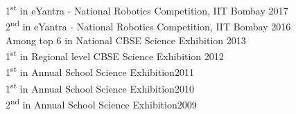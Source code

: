 \documentclass[10pt]{article}
\begin{document}
1\textsuperscript{st} in eYantra - National Robotics Competition, IIT Bombay \hfill 2017\\

2\textsuperscript{nd} in eYantra - National Robotics Competition, IIT Bombay \hfill 2016\\



Among top 6 in National CBSE Science Exhibition \hfill  2013\\


1\textsuperscript{st} in Regional level CBSE Science Exhibition \hfill  2012\\

1\textsuperscript{st} in Annual School Science Exhibition\hfill 2011\\

1\textsuperscript{st} in Annual School Science Exhibition\hfill  2010\\

2\textsuperscript{nd} in Annual School Science Exhibition\hfill  2009\\
\end{document}
